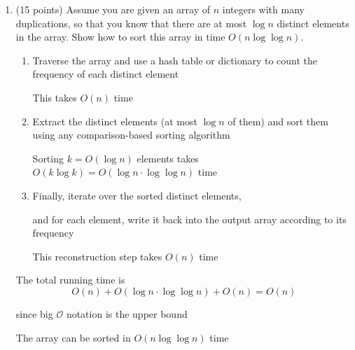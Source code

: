 \begin{enumerate}
\begin{solution}
\begin{enumerate}
  Then
  \[
    \log_2 b=16,\quad d=\frac{128}{16}=8,
  \]
  per-pass cost \(2n+2b=2\cdot65536+2\cdot65536=262144\), and
  \[
    T_{\text{radix}}(b=2^{16})=8\times 262144 = 2097152 \text{ steps}
  \]
\end{enumerate}

\textbf{Comparison and conclusion}
  \[
    T_{\text{merge}}=1048576,\quad
    T_{\text{radix (best)}}\approx 2097152,\quad
    T_{\text{count (full 128-bit range)}}\approx 2^{129}\ 
  \]
  Therefore \textbf{Merge Sort} is the most efficient for sorting this array under the given assumptions

        
	\end{solution}
    
    \item (15 points)
	Assume you are given an array of $n$ integers with many
	duplications, so that you know that there are at most $\log n$
	distinct elements in the array. Show how to sort this array in time
	$O(n \log\!\log n)$.
	
\begin{solution}
\vspace{0.5 cm}


\begin{enumerate}
    \item Traverse the array and use a hash table or dictionary to count the frequency of each distinct element
    
    This takes $O(n)$ time

    
    \item Extract the distinct elements (at most $\log n$ of them) and sort them using any comparison-based sorting algorithm
    
    Sorting $k = O(\log n)$ elements takes $O(k \log k) = O(\log n \cdot \log\!\log n)$ time
    
    \item Finally, iterate over the sorted distinct elements, 
    
    and for each element, write it back into the output array according to its frequency
    
    This reconstruction step takes $O(n)$ time

    
\end{enumerate}

The total running time is
\[
O(n) + O(\log n \cdot \log\!\log n) + O(n) = O(n) 
\]

since big $\mathcal{O}$ notation is the upper bound

The array can be sorted in $O(n \log\!\log n)$ time
\end{solution}





\end{enumerate}

